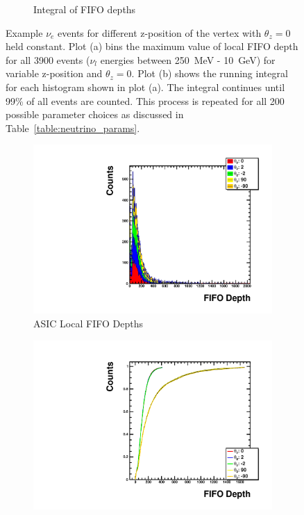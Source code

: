 \begin{figure}
\begin{subfigure}{.5\textwidth}
  \caption{Integral of FIFO depths}
\end{subfigure}
\caption{Example $\nu_{e}$ events for different z-position of the vertex with $\theta_{z} = 0$ held constant.
Plot (a) bins the maximum value of local FIFO depth for all 3900 events ($\nu_{l}$ energies between 250~\unit{MeV} - 10~\unit{GeV}) for variable z-position and $\theta_{z} = 0$.
Plot (b) shows the running integral for each histogram shown in plot (a).
The integral continues until 99\% of all events are counted.
This process is repeated for all 200 possible parameter choices as discussed in Table~\ref{table:neutrino_params}.
}
\label{fig:example_asic_integral_value_constTheta}
\end{figure}

\begin{figure}
\centering
\begin{subfigure}{.5\textwidth}
  \centering
  \includegraphics[width=\textwidth]{images/Const_Z180_ASIC_stack_integral_pdg12_fhc.pdf}
  \caption{ASIC Local FIFO Depths}
\end{subfigure}%
\begin{subfigure}{.5\textwidth}
  \centering
  \includegraphics[width=\textwidth]{images/Const_Z180_ASIC_integral_pdg12_fhc.pdf}

\end{subfigure}
\end{figure}
